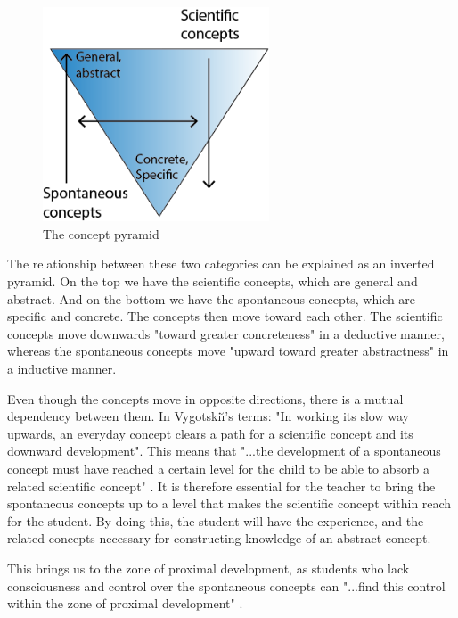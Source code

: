 \begin{figure}
\centering
\includegraphics[width=0.6\textwidth]{img/theoretical/conceptpyramid.png}
\caption{The concept pyramid}
\label{fig:conceptpyramid}
\end{figure}

The relationship between these two categories can be explained as an inverted pyramid. On the top we have the scientific concepts, which are general and abstract. And on the bottom we have the spontaneous concepts, which are specific and concrete. The concepts then move toward each other. The scientific concepts move downwards "toward greater concreteness" in a deductive manner, whereas the spontaneous concepts move "upward toward greater abstractness" \citep{vygotsky2012thought} in a inductive manner.

Even though the concepts move in opposite directions, there is a mutual dependency between them. In Vygotski{\u\i}'s terms: "In working its slow way upwards, an everyday concept clears a path for a scientific concept and its downward development". This means that "...the development of a spontaneous concept must have reached a certain level for the child to be able to absorb a related scientific concept" \citep[p. 194]{vygotsky2012thought}. It is therefore essential for the teacher to bring the spontaneous concepts up to a level that makes the scientific concept within reach for the student. By doing this, the student will have the experience, and the related concepts necessary for constructing knowledge of an abstract concept. 

This brings us to the zone of proximal development, as students who lack consciousness and control over the spontaneous concepts can "...find this control within the zone of proximal development" \citep[p. 194]{vygotsky2012thought}.

